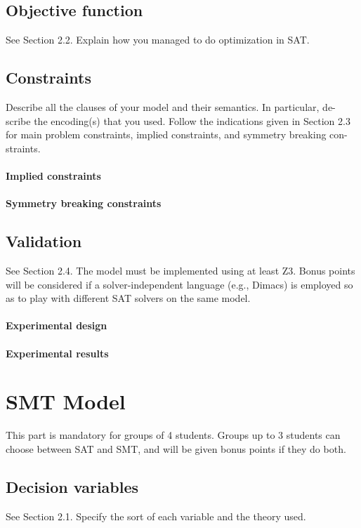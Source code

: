 \documentclass{article}
\begin{document}
\subsection{Objective function}
See Section 2.2. Explain how you managed to do optimization in SAT.

\subsection{Constraints}
Describe all the clauses of your model and their semantics. In particular, de- scribe the encoding(s) that you used. Follow the indications given in Section 2.3 for main problem constraints, implied constraints, and symmetry breaking con- straints.

\paragraph{Implied constraints}

\paragraph{Symmetry breaking constraints}

\subsection{Validation}
See Section 2.4. The model must be implemented using at least Z3. Bonus points will be considered if a solver-independent language (e.g., Dimacs) is employed so as to play with different SAT solvers on the same model.

\paragraph{Experimental design}

\paragraph{Experimental results}


\section{SMT Model}
This part is mandatory for groups of 4 students. Groups up to 3 students can choose between SAT and SMT, and will be given bonus points if they do both.

\subsection{Decision variables}
See Section 2.1. Specify the sort of each variable and the theory used.
\end{document}
